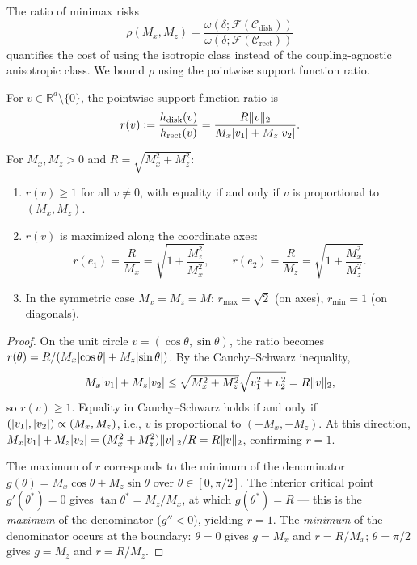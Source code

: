 The ratio of minimax risks
\begin{equation*}
	\rho(M_x, M_z) = \frac{\omega(\delta; \mathcal{F}(\mathcal{C}_{\mathrm{disk}}))}{\omega(\delta; \mathcal{F}(\mathcal{C}_{\mathrm{rect}}))}
\end{equation*}
quantifies the cost of using the isotropic class instead of the coupling-agnostic anisotropic class.
We bound $\rho$ using the pointwise support function ratio.

\begin{definition}\label{def:sfr}
	For $v \in \mathbb{R}^d \setminus \{0\}$, the pointwise support function ratio is
	\begin{equation*}
		r(v) \vcentcolon= \frac{h_{\mathrm{disk}}(v)}{h_{\mathrm{rect}}(v)} = \frac{R \lVert v\rVert_2}{M_x \lvert v_1\rvert + M_z \lvert v_2\rvert}.
	\end{equation*}
\end{definition}

\begin{lemma}\label{lem:ratio_range}
	For $M_x, M_z > 0$ and $R = \sqrt{M_x^2 + M_z^2}$:
	\begin{enumerate}
		\item $r(v) \geq 1$ for all $v \neq 0$, with equality if and only if $v$ is proportional to $(M_x, M_z)$.
		\item $r(v)$ is maximized along the coordinate axes:
		\begin{equation}\label{eq:ratio_axes}
			r(e_1) = \frac{R}{M_x} = \sqrt{1 + \frac{M_z^2}{M_x^2}}, \qquad r(e_2) = \frac{R}{M_z} = \sqrt{1 + \frac{M_x^2}{M_z^2}}.
		\end{equation}
		\item In the symmetric case $M_x = M_z = M$: $r_{\max} = \sqrt{2}$ (on axes), $r_{\min} = 1$ (on diagonals).
	\end{enumerate}
\end{lemma}

\begin{proof}
	On the unit circle $v = (\cos\theta, \sin\theta)$, the ratio becomes $r(\theta) = R / (M_x\lvert\cos\theta\rvert + M_z\lvert\sin\theta\rvert)$.
	By the Cauchy--Schwarz inequality,
	\begin{equation*}
		M_x\lvert v_1\rvert + M_z\lvert v_2\rvert \leq \sqrt{M_x^2 + M_z^2}\sqrt{v_1^2 + v_2^2} = R\lVert v\rVert_2,
	\end{equation*}
	so $r(v) \geq 1$.
	Equality in Cauchy--Schwarz holds if and only if $(\lvert v_1\rvert, \lvert v_2\rvert) \propto (M_x, M_z)$, i.e., $v$ is proportional to $(\pm M_x, \pm M_z)$.
	At this direction, $M_x\lvert v_1\rvert + M_z\lvert v_2\rvert = (M_x^2 + M_z^2)\lVert v\rVert_2/R = R\lVert v\rVert_2$, confirming $r = 1$.

	The maximum of $r$ corresponds to the minimum of the denominator $g(\theta) = M_x\cos\theta + M_z\sin\theta$ over $\theta \in [0, \pi/2]$.
	The interior critical point $g'(\theta^*) = 0$ gives $\tan\theta^* = M_z/M_x$, at which $g(\theta^*) = R$ --- this is the \emph{maximum} of the denominator ($g'' < 0$), yielding $r = 1$.
	The \emph{minimum} of the denominator occurs at the boundary: $\theta = 0$ gives $g = M_x$ and $r = R/M_x$; $\theta = \pi/2$ gives $g = M_z$ and $r = R/M_z$.
\end{proof}

